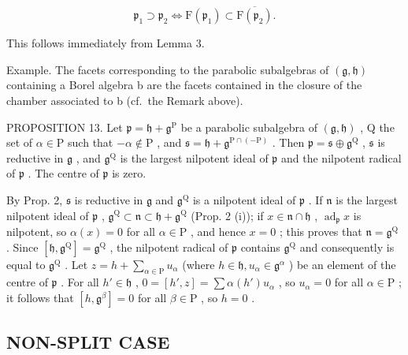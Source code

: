 \[
\mathfrak {p} _ {1} \supset \mathfrak {p} _ {2} \Longleftrightarrow \mathrm{F} (\mathfrak {p} _ {1}) \subset \overline {{\mathrm{F} (\mathfrak {p} _ {2})}}.
\]

This follows immediately from Lemma 3.

Example. The facets corresponding to the parabolic subalgebras of \((\mathfrak{g}, \mathfrak{h})\) containing a Borel algebra b are the facets contained in the closure of the chamber associated to b (cf.~the Remark above).

PROPOSITION 13. Let \(\mathfrak{p} = \mathfrak{h} + \mathfrak{g}^{\mathrm{P}}\) be a parabolic subalgebra of \((\mathfrak{g},\mathfrak{h})\) , Q the set of \(\alpha \in \mathrm{P}\) such that \(-\alpha \notin \mathrm{P}\) , and \(\mathfrak{s} = \mathfrak{h} + \mathfrak{g}^{\mathrm{P}\cap (-\mathrm{P})}\) . Then \(\mathfrak{p} = \mathfrak{s} \oplus \mathfrak{g}^{\mathrm{Q}}\) , \(\mathfrak{s}\) is reductive in \(\mathfrak{g}\) , and \(\mathfrak{g}^{\mathrm{Q}}\) is the largest nilpotent ideal of \(\mathfrak{p}\) and the nilpotent radical of \(\mathfrak{p}\) . The centre of \(\mathfrak{p}\) is zero.

By Prop. 2, \(\mathfrak{s}\) is reductive in \(\mathfrak{g}\) and \(\mathfrak{g}^{\mathrm{Q}}\) is a nilpotent ideal of \(\mathfrak{p}\) . If \(\mathfrak{n}\) is the largest nilpotent ideal of \(\mathfrak{p}\) , \(\mathfrak{g}^{\mathrm{Q}} \subset \mathfrak{n} \subset \mathfrak{h} + \mathfrak{g}^{\mathrm{Q}}\) (Prop. 2 (i)); if \(x \in \mathfrak{n} \cap \mathfrak{h}\) , \(\operatorname{ad}_{\mathfrak{p}} x\) is nilpotent, so \(\alpha(x) = 0\) for all \(\alpha \in \mathrm{P}\) , and hence \(x = 0\) ; this proves that \(\mathfrak{n} = \mathfrak{g}^{\mathrm{Q}}\) . Since \([\mathfrak{h}, \mathfrak{g}^{\mathrm{Q}}] = \mathfrak{g}^{\mathrm{Q}}\) , the nilpotent radical of \(\mathfrak{p}\) contains \(\mathfrak{g}^{\mathrm{Q}}\) and consequently is equal to \(\mathfrak{g}^{\mathrm{Q}}\) . Let \(z = h + \sum_{\alpha \in \mathrm{P}} u_{\alpha}\) (where \(h \in \mathfrak{h}, u_{\alpha} \in \mathfrak{g}^{\alpha}\) ) be an element of the centre of \(\mathfrak{p}\) . For all \(h' \in \mathfrak{h}\) , \(0 = [h', z] = \sum \alpha(h')u_{\alpha}\) , so \(u_{\alpha} = 0\) for all \(\alpha \in \mathrm{P}\) ; it follows that \([h, \mathfrak{g}^{\beta}] = 0\) for all \(\beta \in \mathrm{P}\) , so \(h = 0\) .

\subsection{NON-SPLIT CASE}

